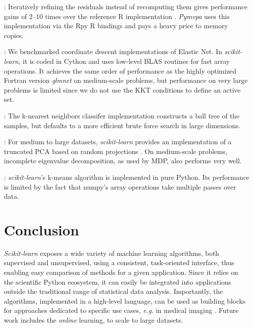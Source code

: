 \documentclass[twoside,11pt]{article}
\begin{document}
\smallskip {}:
%
Iteratively refining the residuals instead of recomputing them gives
performance gains of 2--10 times over the reference R implementation
\citep{LARS}. {\sl Pymvpa} uses this implementation via the Rpy R
bindings and pays a heavy price to memory copies.


\smallskip {}:
%
We benchmarked coordinate descent implementations of Elastic Net.  In
\emph{scikit-learn}, it is coded in Cython and uses low-level BLAS
routines for fast array operations. It achieves the same order of
performance as the highly optimized Fortran version \emph{glmnet}
\citep{friedman2010} on medium-scale problems, but performance on very
large problems is limited since we do not use the KKT conditions to
define an active set.

\smallskip
{}:
%
The k-nearest neighbors classifer implementation constructs a ball
tree \citep{omohundro1989} of the samples, but defaults to a more
efficient brute force search in large dimensions.

\smallskip {}:
%
For medium to large datasets, \emph{scikit-learn} provides an
implementation of a truncated PCA based on random projections
\citep{rokhlin2009}. On medium-scale problems, incomplete eigenvalue
decomposition, as used by MDP, also performs very well.

\smallskip
{}:
%
\emph{scikit-learn}'s k-means algorithm is implemented in pure
Python.  Its performance is limited by the fact that numpy's
array operations take multiple passes over data.

\section{Conclusion}

\emph{Scikit-learn} exposes a wide variety of machine learning
algorithms, both supervised and unsupervised, using a consistent,
task-oriented interface, thus enabling easy comparison of methods for a
given application.
%
Since it relies on the scientific Python ecosystem, it can easily be
integrated into applications outside the traditional range of statistical
data analysis. Importantly, the algorithms, implemented in a high-level
language, can be used as building blocks for approaches dedicated to
specific use cases, \emph{e.g.} in medical imaging \citep{Michel2011}.
%
Future work includes the \emph{online} learning, to scale to
large datasets.


\end{document}
